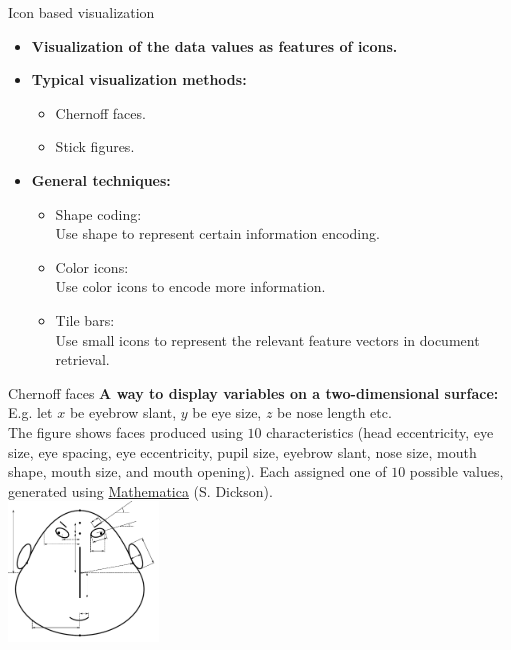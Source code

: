 \documentclass[aspectratio=169,t]{beamer}
\begin{document}
  { 
    \begin{frame}{Icon based visualization}
    \centering
    \begin{itemize}
      \item \textbf{Visualization of the data values as features of icons.}
      \item \textbf{Typical visualization methods:}
      \begin{itemize}
        \item Chernoff faces.
        \item Stick figures.
      \end{itemize}
      \item \textbf{General techniques:}
      \begin{itemize}
        \item Shape coding:\\
              \small{Use shape to represent certain information encoding.}
        \item Color icons:\\
              \small{Use color icons to encode more information.}
        \item Tile bars:\\
              \small{Use small icons to represent the relevant feature vectors in document retrieval.}
      \end{itemize}
    \end{itemize}
    \end{frame}
  }

  { 
    \begin{frame}{Chernoff faces}
    \textbf{A way to display variables on a two-dimensional surface:}\\
    E.g. let $x$ be eyebrow slant, $y$ be eye size, $z$ be nose length etc.\\
    The figure shows faces produced using $10$ characteristics (head eccentricity, eye size, eye spacing, eye eccentricity, pupil size, eyebrow slant, nose size, mouth shape, mouth size, and mouth opening). Each assigned one of $10$ possible values, generated using \href{https://www.wolfram.com/mathematica/}{Mathematica} (S. Dickson).\\[0.5cm]
    \centering
    \includegraphics[width=4cm]{img/chernoff_faces_construction.pdf}
    \end{frame}
  }
\end{document}
